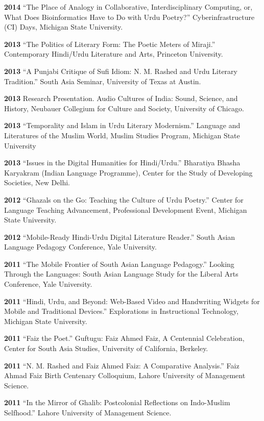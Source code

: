 \documentclass[letterpaper,12pt]{article}
\begin{document}
\textbf{2014}
“The Place of Analogy in Collaborative, Interdisciplinary Computing,
or,
What Does Bioinformatics Have to Do with Urdu Poetry?”
Cyberinfrastructure (CI) Days, Michigan State University.

\textbf{2013}
“The Politics of Literary Form: The Poetic Meters of Miraji.”
Contemporary Hindi/Urdu Literature and Arts, Princeton University.

\textbf{2013}
“A Punjabi Critique of Sufi Idiom: N. M. Rashed and Urdu Literary Tradition.”
South Asia Seminar, University of Texas at Austin.

\textbf{2013}
Research Presentation.
Audio Cultures of India: Sound, Science, and History,
Neubauer Collegium for Culture and Society, University of Chicago.

\textbf{2013}
“Temporality and Islam in Urdu Literary Modernism.”
Language and Literatures of the Muslim World,
Muslim Studies Program,
Michigan State University

\textbf{2013}
“Issues in the Digital Humanities for Hindi/Urdu.”
Bharatiya Bhasha Karyakram (Indian Language Programme),
Center for the Study of Developing Societies, New Delhi.

\textbf{2012}
“Ghazals on the Go: Teaching the Culture of Urdu Poetry.”
Center for Language Teaching Advancement,
Professional Development Event,
Michigan State University.

\textbf{2012}
“Mobile-Ready Hindi-Urdu Digital Literature Reader.”
South Asian Language Pedagogy Conference, Yale University.

\textbf{2011}
“The Mobile Frontier of South Asian Language Pedagogy.”
Looking Through the Languages:
South Asian Language Study for the Liberal Arts Conference,
Yale University.

\textbf{2011}
“Hindi, Urdu, and Beyond:
Web-Based Video and Handwriting Widgets for Mobile and Traditional Devices.”
Explorations in Instructional Technology, Michigan State University.

\textbf{2011}
“Faiz the Poet.”
Guftugu: Faiz Ahmed Faiz, A Centennial Celebration,
Center for South Asia Studies, University of California, Berkeley.

\textbf{2011}
“N. M. Rashed and Faiz Ahmed Faiz: A Comparative Analysis.”
Faiz Ahmad Faiz Birth Centenary Colloquium,
Lahore University of Management Science.

\textbf{2011}
“In the Mirror of Ghalib: Postcolonial Reflections on Indo-Muslim Selfhood.”
Lahore University of Management Science.
\end{document}
